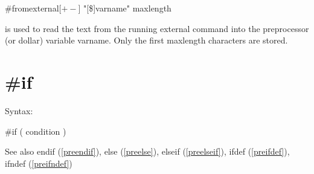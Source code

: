 \#fromexternal[$+-$] "[\$]varname" maxlength

\noindent is used to read the text from the running external command into 
the preprocessor (or dollar) variable varname. Only the first maxlength 
characters are stored.


\section{\#if}
\label{preif}

\noindent Syntax:

\#if ( condition )
 
\noindent See also endif (\ref{preendif}),
            else (\ref{preelse}),
            elseif (\ref{preelseif}),
            ifdef (\ref{preifdef}),
            ifndef (\ref{preifndef})

